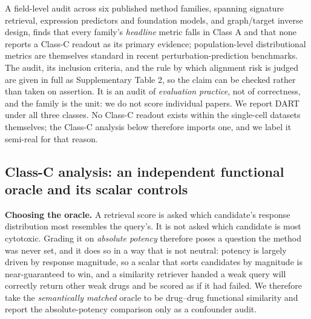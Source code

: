 \documentclass[11pt,letterpaper]{article}
\begin{document}
A field-level audit across six published method families, spanning signature
retrieval\cite{ref1,ref2,ref3}, expression predictors and foundation
models\cite{ref4,ref5,ref6,ref7,ref8,ref9}, and graph/target inverse
design\cite{ref10,ref11,ref12}, finds that every family's \emph{headline} metric falls in Class A
and that none reports a Class-C readout as its primary evidence; population-level distributional
metrics are themselves standard in recent perturbation-prediction benchmarks\cite{ref15}. The
audit, its inclusion criteria, and the rule by which alignment risk is judged are given in full as
Supplementary Table 2, so the claim can be checked rather than taken on assertion. It is an audit
of \emph{evaluation practice}, not of correctness, and the family is the unit: we do not score
individual papers. We report DART under all three classes. No Class-C readout exists within the
single-cell datasets themselves; the Class-C analysis below therefore imports one, and we label it
semi-real for that reason.

\subsection*{Class-C analysis: an independent functional oracle and its scalar controls}

\textbf{Choosing the oracle.} A retrieval score is asked which candidate's response distribution
most resembles the query's. It is not asked which candidate is most cytotoxic. Grading it on
\emph{absolute potency} therefore poses a question the method was never set, and it does so in a
way that is not neutral: potency is largely driven by response magnitude, so a scalar that sorts
candidates by magnitude is near-guaranteed to win, and a similarity retriever handed a weak query
will correctly return other weak drugs and be scored as if it had failed. We therefore take the
\emph{semantically matched} oracle to be drug--drug functional similarity and report the
absolute-potency comparison only as a confounder audit.
\end{document}
